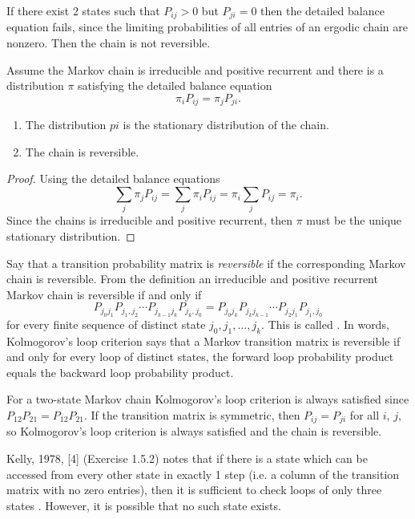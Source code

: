\documentclass[12pt]{article}
\begin{document}
\begin{remark}
  If there exist $2$ states such that $P_{ij} > 0$ but $P_{ji} = 0$
  then the detailed balance equation fails, since the limiting probabilities of all
entries of an ergodic chain are nonzero. 
  Then the chain is not reversible.
\end{remark}

\begin{theorem}
  Assume the Markov chain is irreducible and positive recurrent and
  there is a distribution $\pi$ satisfying the detailed balance equation
  \[
    \pi_i P_{ij} = \pi_j P_{ji}.
  \]
  \begin{enumerate}
  \item The distribution $pi$ is the stationary distribution of the chain.
  \item The chain is reversible.
  \end{enumerate}
\end{theorem}

\begin{proof}
  Using the detailed balance equations
  \[
    \sum_j \pi_j P_{ij} = \sum_j \pi_i P_{ij} = \pi_i \sum_j P_{ij} =
    \pi_i.
  \]
  Since the chains is irreducible and positive recurrent, then $\pi$
  must be the unique stationary distribution.
\end{proof}

Say that a transition probability matrix is
\emph{reversible} if the
corresponding Markov chain is reversible.  From the definition an
irreducible and positive recurrent Markov chain is reversible if and
only if
\[
  P_{j_0 j_1} P_{j_1,j_2} \cdots P_{j_{k-1} j_k} P_{j_k, j_0} =
  P_{j_0 j_k} P_{j_k j_{k-1}} \cdots P_{j_2 j_1} P_{j_1, j_0}
\]
for every finite sequence of distinct state $j_0, j_1, \dots, j_k$.
This is called .
In words, Kolmogorov’s loop criterion says that a Markov transition matrix is
reversible if and only for every loop of distinct states, the forward loop probability product
equals the backward loop probability product.

For a two-state Markov chain Kolmogorov's loop criterion is always
satisfied since $P_{12} P_{21} = P_{12} P_{21}$.  If the transition
matrix is symmetric, then $P_{ij} = P_{ji}$ for all $i$, $j$, so
Kolmogorov's loop criterion is always satisfied and the chain is
reversible.  

Kelly, 1978, [4] (Exercise 1.5.2) notes that
if there is a state which can be accessed from every other state in exactly 1 step
(i.e. a column of the transition matrix with no zero entries), then it is sufficient to
check loops of only three states . However, it is possible that no
such state exists.
\end{document}
